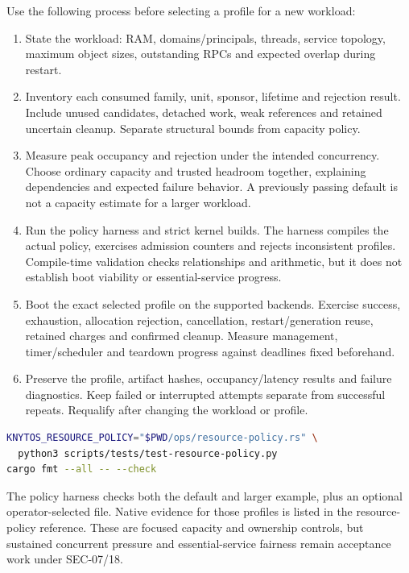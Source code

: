 Use the following process before selecting a profile for a new workload:
\begin{enumerate}
    \item State the workload: RAM, domains/principals, threads, service topology,
        maximum object sizes, outstanding RPCs and expected overlap during restart.
    \item Inventory each consumed family, unit, sponsor, lifetime and rejection
        result. Include unused candidates, detached work, weak references and
        retained uncertain cleanup. Separate structural bounds from capacity policy.
    \item Measure peak occupancy and rejection under the intended concurrency.
        Choose ordinary capacity and trusted headroom together, explaining
        dependencies and expected failure behavior. A previously passing default
        is not a capacity estimate for a larger workload.
    \item Run the policy harness and strict kernel builds. The harness compiles
        the actual policy, exercises admission counters and rejects inconsistent
        profiles. Compile-time validation checks relationships and arithmetic, but
        it does not establish boot viability or essential-service progress.
    \item Boot the exact selected profile on the supported backends. Exercise
        success, exhaustion, allocation rejection, cancellation, restart/generation
        reuse, retained charges and confirmed cleanup. Measure management,
        timer/scheduler and teardown progress against deadlines fixed beforehand.
    \item Preserve the profile, artifact hashes, occupancy/latency results and
        failure diagnostics. Keep failed or interrupted attempts separate from
        successful repeats. Requalify after changing the workload or profile.
\end{enumerate}

\noindent\begin{minipage}{\linewidth}
\begin{lstlisting}[language=bash]
KNYTOS_RESOURCE_POLICY="$PWD/ops/resource-policy.rs" \
  python3 scripts/tests/test-resource-policy.py
cargo fmt --all -- --check
\end{lstlisting}
\end{minipage}

The policy harness checks both the default and larger example, plus an optional
operator-selected file. Native evidence for those profiles is listed in the resource-policy reference.
These are focused capacity and ownership controls, but sustained concurrent pressure and
essential-service fairness remain acceptance work under SEC-07/18.

